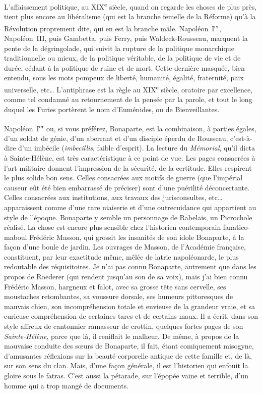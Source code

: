 \documentclass[french,twoside]{book} %
\begin{document}
L’affaissement politique, au XIX\textsuperscript{e} siècle, quand on regarde les choses de plus près, tient plus encore au libéralisme (qui est la branche femelle de la Réforme) qu’à la Révolution proprement dite, qui en est la branche mâle. Napoléon I\textsuperscript{er}, Napoléon III, puis Gambetta, puis Ferry, puis Waldeck-Rousseau, marquent la pente de la dégringolade, qui suivit la rupture de la politique monarchique traditionnelle ou mieux, de la politique véritable, de la politique de vie et de durée, cédant à la politique de ruine et de mort. Cette dernière masquée, bien entendu, sous les mots pompeux de liberté, humanité, égalité, fraternité, paix universelle, etc… L’antiphrase est la règle au XIX\textsuperscript{e} siècle, oratoire par excellence, comme tel condamné au retournement de la pensée par la parole, et tout le long duquel les Furies portèrent le nom d’Euménides, ou de Bienveillantes.\par
Napoléon I\textsuperscript{er} ou, si vous préférez, Bonaparte, est la combinaison, à parties égales, d’un soldat de génie, d’un aberrant et d’un disciple éperdu de Rousseau, c’est-à-dire d’un imbécile ({\itshape imbecillis}, faible d’esprit). La lecture du {\itshape Mémorial}, qu’il dicta à Sainte-Hélène, est très caractéristique à ce point de vue. Les pages consacrées à l’art militaire donnent l’impression de la sécurité, de la certitude. Elles respirent le plus solide bon sens. Celles consacrées aux motifs de guerre (que l’impérial causeur eût été bien embarrassé de préciser) sont d’une puérilité déconcertante. Celles consacrées aux institutions, aux travaux des jurisconsultes, etc… apparaissent comme d’une rare niaiserie et d’une outrecuidance qui appartient au style de l’époque. Bonaparte y semble un personnage de Rabelais, un Picrochole réalisé. La chose est encore plus sensible chez l’historien contemporain fanatico-maboul Frédéric Masson, qui grossit les insanités de son idole Bonaparte, à la façon d’une boule de jardin. Les ouvrages de Masson, de l’Académie française, constituent, par leur exactitude même, mêlée de latrie napoléonarde, le plus redoutable des réquisitoires. Je n’ai pas connu Bonaparte, autrement que dans les propos de Roederer (qui rendent jusqu’au son de sa voix), mais j’ai bien connu Frédéric Masson, hargneux et falot, avec sa grosse tête sans cervelle, ses moustaches retombantes, sa voussure dorsale, ses humeurs pittoresques de mauvais chien, son incompréhension totale et envieuse de la grandeur vraie, et sa curieuse compréhension de certaines tares et de certains maux. Il a écrit, dans son style affreux de cantonnier ramasseur de crottin, quelques fortes pages de son {\itshape Sainte-Hélène}, parce que là, il reniflait le malheur. De même, à propos de la mauvaise conduite des sœurs de Bonaparte, il fait, étant comiquement misogyne, d’amusantes réflexions sur la beauté corporelle antique de cette famille et, de là, sur son sens du clan. Mais, d’une façon générale, il est l’historien qui enfouit la gloire sous le fatras. C’est aussi la pétarade, sur l’épopée vaine et terrible, d’un homme qui a trop mangé de documents.\par
\end{document}
